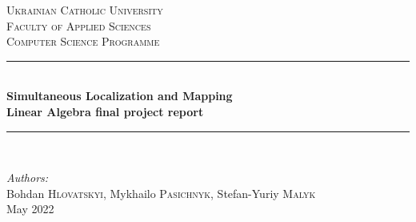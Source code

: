 \begin{titlepage}

\newcommand{\HRule}{\rule{\linewidth}{0.5mm}} %

\center %
 

\textsc{\LARGE Ukrainian Catholic University}\\[1cm] %
\textsc{\Large  Faculty of Applied Sciences}\\[0.5cm] %
\textsc{\large Computer Science Programme}\\[0.5cm] %

\vspace*{1cm}

\HRule \\[0.4cm]
{ \huge \bfseries Simultaneous Localization and Mapping }\\[10pt]
{\Large \bfseries Linear Algebra final project report}\\[0.4cm] %
\HRule \\[1cm]
 
\vspace*{1cm}

\Large \emph{Authors:}\\
Bohdan \textsc{Hlovatskyi}, Mykhailo \textsc{Pasichnyk}, Stefan-Yuriy \textsc{Malyk}\\[1cm] %

\vspace*{1cm}
{\large May 2022 }\\[2cm] %


\end{titlepage}
